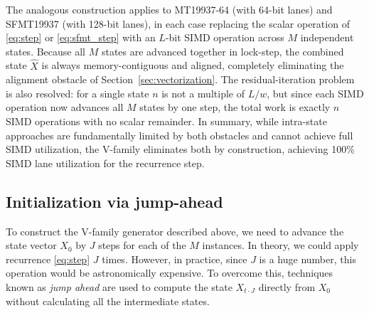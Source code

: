\documentclass[preprint,1p,times]{elsarticle}
\begin{document}
The analogous construction applies to MT19937-64 (with 64-bit lanes) and SFMT19937 (with 128-bit lanes), in each case replacing the scalar operation of \eqref{eq:step} or \eqref{eq:sfmt_step} with an $L$-bit SIMD operation across $M$ independent states. Because all $M$ states are advanced together in lock-step, the combined state $\hat{X}$ is always memory-contiguous and aligned, completely eliminating the alignment obstacle of Section~\ref{sec:vectorization}. The residual-iteration problem is also resolved: for a single state $n$ is not a multiple of $L/w$, but since each SIMD operation now advances all $M$ states by one step, the total work is exactly $n$ SIMD operations with no scalar remainder. In summary, while intra-state approaches are fundamentally limited by both obstacles and cannot achieve full SIMD utilization, the V-family eliminates both by construction, achieving 100\% SIMD lane utilization for the recurrence step.

\subsection{Initialization via jump-ahead}
To construct the V-family generator described above, we need to advance the state vector $X_0$ by $J$ steps for each of the $M$ instances. In theory, we could apply recurrence \eqref{eq:step} $J$ times. However, in practice, since $J$ is a huge number, this operation would be astronomically expensive.
To overcome this, techniques known as \textit{jump ahead} are used to compute the state $X_{t \cdot J}$ directly from $X_0$ without calculating all the intermediate states.
\end{document}

